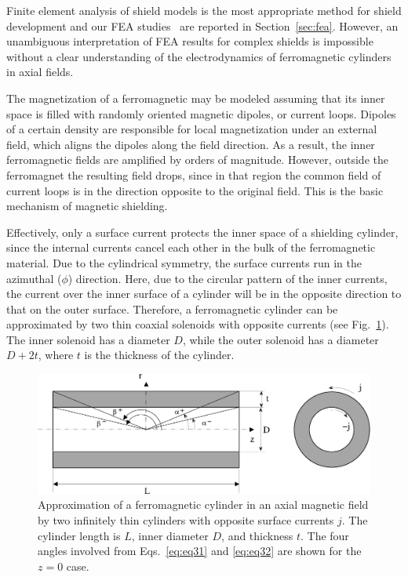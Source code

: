 \documentclass[12pt]{article}
\begin{document}
Finite element analysis of shield models is the most appropriate method for 
shield development and our FEA studies~\cite{dynshi,wieland} are reported in 
Section~\ref{sec:fea}. However, an unambiguous interpretation of FEA results
for complex shields is impossible without a clear understanding of the 
electrodynamics of ferromagnetic cylinders in axial fields.

The magnetization of a ferromagnetic may be modeled assuming that its inner space 
is filled with randomly oriented magnetic dipoles, or current loops. Dipoles of a 
certain density are responsible for local magnetization under an external field, 
which aligns the dipoles along the field direction. As a result, the inner 
ferromagnetic fields are amplified by orders of magnitude. However, outside the 
ferromagnet the resulting field drops, since in that region the common field of 
current loops is in the direction opposite to the original field. This is the basic 
mechanism of magnetic shielding.

Effectively, only a surface current protects the inner space of a shielding 
cylinder, since the internal currents cancel each other in the bulk of the 
ferromagnetic material. Due to the cylindrical symmetry, the surface currents run 
in the azimuthal ($\phi$) direction. Here, due to the circular pattern of the inner 
currents, the current over the inner surface of a cylinder will be in the opposite 
direction to that on the outer surface. Therefore, a ferromagnetic cylinder can be 
approximated by two thin coaxial solenoids with opposite currents (see 
Fig.~\ref{flatcylinder}). The inner solenoid has a diameter $D$, while the outer 
solenoid has a diameter $D+2t$, where $t$ is the thickness of the cylinder.

\begin{figure}[htbp]
\centering
\includegraphics[width=12cm]{flatcylinder.eps}
\caption{Approximation of a ferromagnetic cylinder in an axial magnetic field
by two infinitely thin cylinders with opposite surface currents $j$. The cylinder 
length is $L$, inner diameter $D$, and thickness $t$. The four angles involved 
from Eqs.~\ref{eq:eq31} and \ref{eq:eq32} are shown for the $z=0$ case.}
\label{flatcylinder}
\end{figure}
\end{document}

